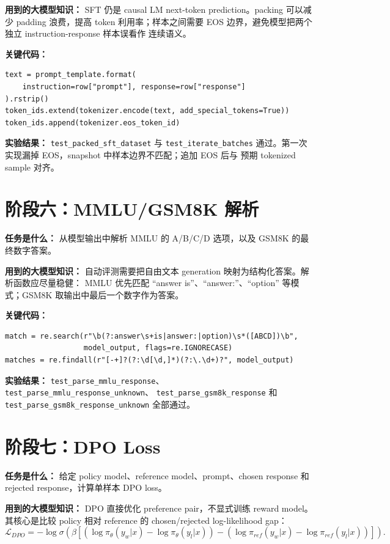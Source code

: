\documentclass[UTF8]{ctexart}
\begin{document}
\textbf{用到的大模型知识：} SFT 仍是 causal LM next-token prediction。packing 可以减少 padding
浪费，提高 token 利用率；样本之间需要 EOS 边界，避免模型把两个独立 instruction-response 样本误看作
连续语义。

\textbf{关键代码：}
\begin{verbatim}
text = prompt_template.format(
    instruction=row["prompt"], response=row["response"]
).rstrip()
token_ids.extend(tokenizer.encode(text, add_special_tokens=True))
token_ids.append(tokenizer.eos_token_id)
\end{verbatim}

\textbf{实验结果：} \texttt{test\_packed\_sft\_dataset} 与
\texttt{test\_iterate\_batches} 通过。第一次实现漏掉 EOS，snapshot 中样本边界不匹配；追加 EOS 后与
预期 tokenized sample 对齐。

\section{阶段六：MMLU/GSM8K 解析}

\textbf{任务是什么：} 从模型输出中解析 MMLU 的 A/B/C/D 选项，以及 GSM8K 的最终数字答案。

\textbf{用到的大模型知识：} 自动评测需要把自由文本 generation 映射为结构化答案。解析函数应尽量稳健：
MMLU 优先匹配 ``answer is''、``answer:''、``option'' 等模式；GSM8K 取输出中最后一个数字作为答案。

\textbf{关键代码：}
\begin{verbatim}
match = re.search(r"\b(?:answer\s+is|answer:|option)\s*([ABCD])\b",
                  model_output, flags=re.IGNORECASE)
matches = re.findall(r"[-+]?(?:\d[\d,]*)(?:\.\d+)?", model_output)
\end{verbatim}

\textbf{实验结果：} \texttt{test\_parse\_mmlu\_response}、
\texttt{test\_parse\_mmlu\_response\_unknown}、
\texttt{test\_parse\_gsm8k\_response} 和
\texttt{test\_parse\_gsm8k\_response\_unknown} 全部通过。

\section{阶段七：DPO Loss}

\textbf{任务是什么：} 给定 policy model、reference model、prompt、chosen response 和 rejected
response，计算单样本 DPO loss。

\textbf{用到的大模型知识：} DPO 直接优化 preference pair，不显式训练 reward model。其核心是比较
policy 相对 reference 的 chosen/rejected log-likelihood gap：
\[
\mathcal{L}_{DPO}
= -\log\sigma\left(\beta\left[
(\log\pi_\theta(y_w|x)-\log\pi_\theta(y_l|x))
-(\log\pi_{ref}(y_w|x)-\log\pi_{ref}(y_l|x))
\right]\right).
\]
\end{document}
